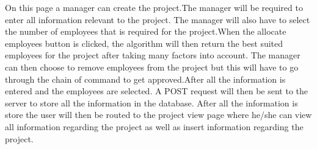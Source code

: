 \documentclass[a4paper,12pt]{article}
\begin{document}
On this page a manager can create the project.The manager will be required to enter all information relevant to the project. The manager will also have to select the number of employees that is required for the project.When the allocate employees button is clicked, the algorithm will then return the best suited employees for the project after taking many factors into account. The manager can then choose to remove employees from the project but this will have to go through the chain of command to get approved.After all the information is entered and the employees are selected. A POST request will then be sent to the server to store all the information in the database. After all the information is store the user will then be routed to the project view page where he/she can view all information regarding the project as well as insert information regarding the project.
\end{document}
